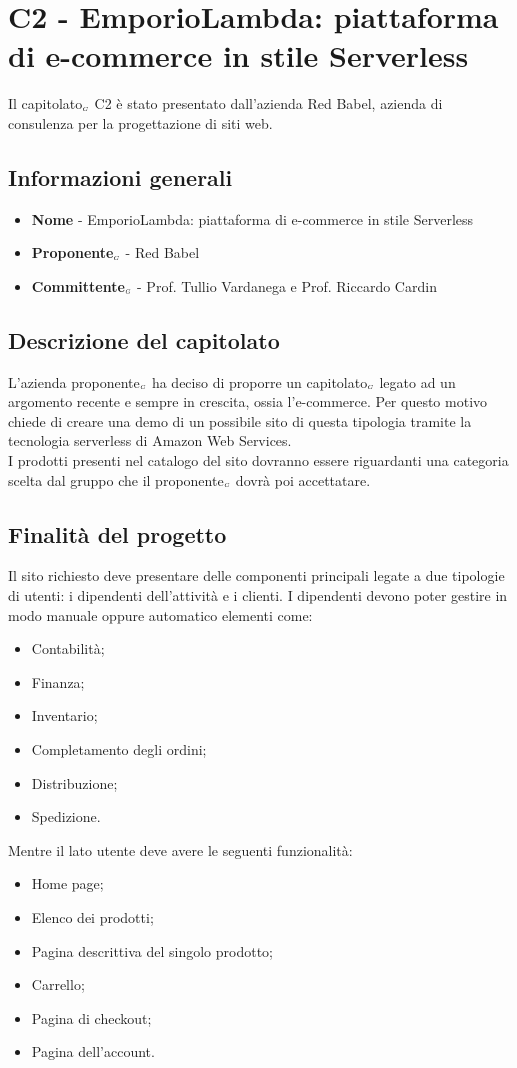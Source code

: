 \chapter{C2 - EmporioLambda: piattaforma di e-commerce in stile Serverless} \label{CapitolatoC2}
Il capitolato$_{\scaleto{G}{3pt}}$ C2 è stato presentato dall'azienda Red Babel, azienda di consulenza per la progettazione di siti web.
\section{Informazioni generali} \label{C2InformazioniGenerali}
\begin{itemize}
	\item \textbf{Nome} - EmporioLambda: piattaforma di e-commerce in stile Serverless
	\item \textbf{Proponente}$_{\scaleto{G}{3pt}}$ - Red Babel
	\item \textbf{Committente}$_{\scaleto{G}{3pt}}$ - Prof. Tullio Vardanega e Prof. Riccardo Cardin
\end{itemize}
\section{Descrizione del capitolato} \label{C2DescrizioneDelCapitolato}
L'azienda proponente$_{\scaleto{G}{3pt}}$ ha deciso di proporre un capitolato$_{\scaleto{G}{3pt}}$ legato ad un argomento recente e sempre in crescita, ossia l'e-commerce. Per questo motivo chiede di creare una demo di un possibile sito di questa tipologia tramite la tecnologia serverless di Amazon Web Services. \\
I prodotti presenti nel catalogo del sito dovranno essere riguardanti una categoria scelta dal gruppo che il proponente$_{\scaleto{G}{3pt}}$ dovrà poi accettatare.
\section{Finalità del progetto} \label{C2FinalitàDelProgetto}
Il sito richiesto deve presentare delle componenti principali legate a due tipologie di utenti: i dipendenti dell'attività e i clienti. I dipendenti devono poter gestire in modo manuale oppure automatico elementi come:
\begin{itemize}
	\item Contabilità;
	\item Finanza;
	\item Inventario;
	\item Completamento degli ordini;
	\item Distribuzione;
	\item Spedizione.
\end{itemize}
Mentre il lato utente deve avere le seguenti funzionalità:
\begin{itemize}
	\item Home page;
	\item Elenco dei prodotti;
	\item Pagina descrittiva del singolo prodotto;
	\item Carrello;
	\item Pagina di checkout;
	\item Pagina dell'account.
\end{itemize}
